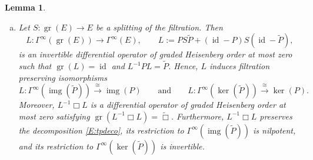 \documentclass[reqno,12pt]{amsart}
\DeclareMathOperator{\img}{img}
\DeclareMathOperator{\gr}{gr}
\DeclareMathOperator{\id}{id}
\theoremstyle{plain}
\newtheorem{lemma}[theorem]{Lemma}
\theoremstyle{definition}
\begin{document}
\begin{lemma}
\begin{enumerate}[(a)]
\item
Let $S\colon\gr(E)\to E$ be a splitting of the filtration.
Then
\begin{equation}\label{E:tL}
L\colon\Gamma^\infty(\gr(E))\to\Gamma^\infty(E),\qquad
L:=PS\tilde P+(\id-P)S(\id-\tilde P),
\end{equation}
is an invertible differential operator of graded Heisenberg order at most zero such that $\gr(L)=\id$ and $L^{-1}PL=\tilde P$.
Hence, $L$ induces filtration preserving isomorphisms
$$
L\colon\Gamma^\infty(\img(\tilde P))\xrightarrow\cong\img(P)
\qquad\text{and}\qquad
L\colon\Gamma^\infty(\ker(\tilde P))\xrightarrow\cong\ker(P).
$$
Moreover, $L^{-1}\Box L$ is a differential operator of graded Heisenberg order at most zero satisfying $\gr(L^{-1}\Box L)=\tilde\Box$.
Furthermore, $L^{-1}\Box L$ preserves the decomposition \eqref{E:tpdeco}, its restriction to $\Gamma^\infty(\img(\tilde P))$ is nilpotent, and its restriction to $\Gamma^\infty(\ker(\tilde P))$ is invertible.
\end{enumerate}
\end{lemma}
\end{document}
